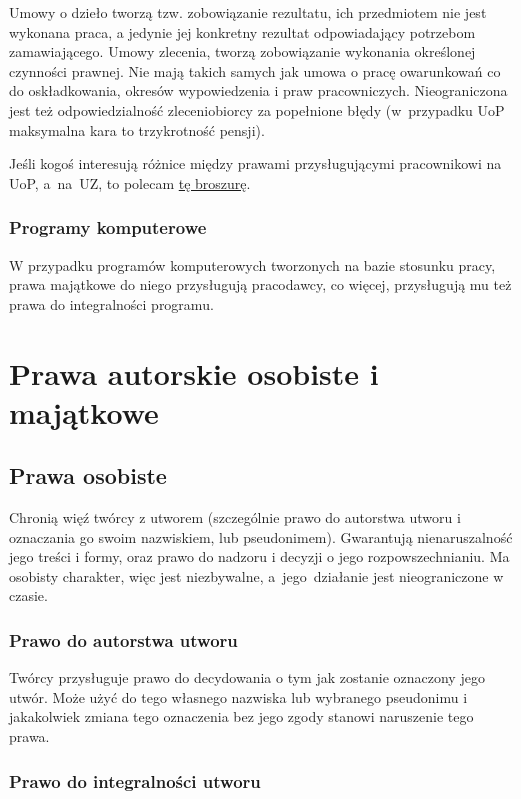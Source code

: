 \documentclass{article}
\begin{document}
Umowy o dzieło tworzą tzw. zobowiązanie rezultatu, ich przedmiotem nie jest wykonana praca, a jedynie jej konkretny rezultat odpowiadający potrzebom zamawiającego. Umowy zlecenia, tworzą zobowiązanie wykonania określonej czynności prawnej. Nie mają takich samych jak umowa o pracę owarunkowań co do oskładkowania, okresów wypowiedzenia i praw pracowniczych. Nieograniczona jest też odpowiedzialność zleceniobiorcy za popełnione błędy (w~przypadku UoP maksymalna kara to trzykrotność pensji).

Jeśli kogoś interesują różnice między prawami przysługującymi pracownikowi na UoP, a~na~UZ, to polecam
\href{https://ozzip.pl/publikacje/ksiazki-i-broszury/item/3004-umowa-o-prace-broszura}{tę broszurę}.

\subsubsection{Programy komputerowe}

W przypadku programów komputerowych tworzonych na bazie stosunku pracy, prawa majątkowe do niego przysługują pracodawcy, co więcej, przysługują mu też prawa do integralności programu.

\section{Prawa autorskie osobiste i majątkowe}

\subsection{Prawa osobiste}

Chronią więź twórcy z utworem (szczególnie prawo do autorstwa utworu i oznaczania go swoim nazwiskiem, lub pseudonimem).
Gwarantują nienaruszalność jego treści i formy, oraz prawo do nadzoru i decyzji o jego rozpowszechnianiu.
Ma osobisty charakter, więc jest niezbywalne, a~jego~działanie jest nieograniczone w czasie.

\subsubsection{Prawo do autorstwa utworu}

Twórcy przysługuje prawo do decydowania o tym jak zostanie oznaczony jego utwór.
Może użyć do tego własnego nazwiska lub wybranego pseudonimu i jakakolwiek zmiana tego oznaczenia bez jego zgody stanowi naruszenie tego prawa.

\subsubsection{Prawo do integralności utworu}
\end{document}
